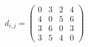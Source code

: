\documentclass[12pt]{article}
\begin{document}
$ \begin{equation*}    d_{i,j} =     \begin{pmatrix}    0 & 3 & 2 & 4 \\    4 & 0 & 5 & 6 \\    3  & 6  & 0 & 3  \\    3 & 5 & 4 & 0     \end{pmatrix}    \end{equation*} $
\end{document}

